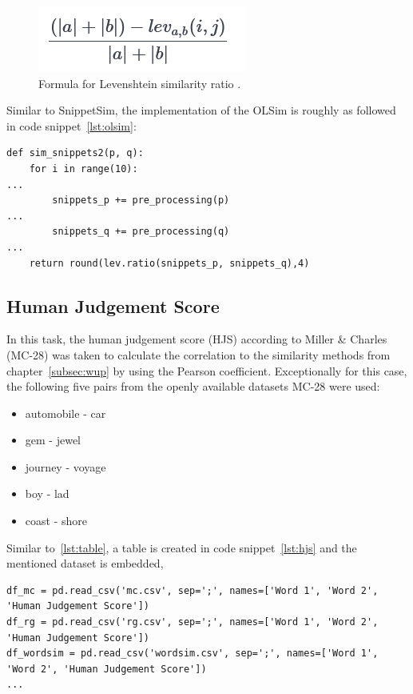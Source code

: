 \documentclass[conference]{IEEEtran}
\begin{document}
\begin{figure}[h]
\centerline{\includegraphics[scale=0.6]{img/levratio.png}}
\caption{Formula for Levenshtein similarity ratio \cite{fuzzy}.}
\label{fig:levratio}
\end{figure}

Similar to SnippetSim, the implementation of the OLSim is roughly as followed in code snippet~\ref{lst:olsim}:

\begin{lstlisting}[frame=single, label=lst:olsim, caption={Calculation of OLSim}, captionpos=b]
def sim_snippets2(p, q):
    for i in range(10):
...
        snippets_p += pre_processing(p)
...
        snippets_q += pre_processing(q)   
...
    return round(lev.ratio(snippets_p, snippets_q),4)
\end{lstlisting}

\subsection{Human Judgement Score}\label{subsec:humanjudge}

In this task, the human judgement score (HJS) according to Miller \& Charles (MC-28)  \cite{miller} was taken to calculate the correlation to the similarity methods from chapter~\ref{subsec:wup} by using the Pearson coefficient. Exceptionally for this case, the following five pairs from the openly available datasets MC-28 \cite{miller} were used:

\begin{itemize}
\item automobile - car
\item gem - jewel
\item journey - voyage
\item boy - lad
\item coast - shore
\end{itemize}

Similar to~\ref{lst:table}, a table is created in code snippet~\ref{lst:hjs} and the mentioned dataset is embedded,

\begin{lstlisting}[frame=single, label=lst:hjs, caption={HJS correlation with WUP, Path, LCH}, captionpos=b]
df_mc = pd.read_csv('mc.csv', sep=';', names=['Word 1', 'Word 2', 'Human Judgement Score'])
df_rg = pd.read_csv('rg.csv', sep=';', names=['Word 1', 'Word 2', 'Human Judgement Score'])
df_wordsim = pd.read_csv('wordsim.csv', sep=';', names=['Word 1', 'Word 2', 'Human Judgement Score'])
...
\end{lstlisting}
\end{document}
